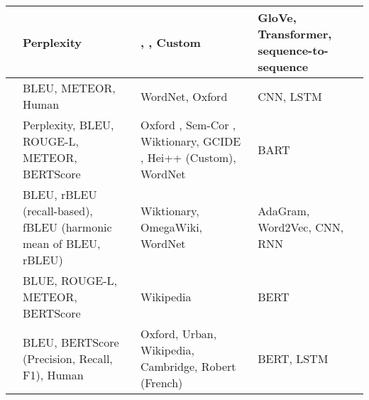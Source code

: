 \begin{longtable}{|p{3.5cm}|p{3.5cm}|p{3.5cm}|p{3.5cm}|}
    \hline
    \citeauthor{mickus_mark_2019} \citeyear{mickus_mark_2019} \cite{mickus_mark_2019}                                        & Perplexity                                                       & \cite{noraset_definition_2016}, \cite{gadetsky_conditional_2018}, Custom                                                                      & GloVe, Transformer, sequence-to-sequence \\
    \hline
    \citeauthor{li_explicit_2020} \citeyear{li_explicit_2020} \cite{li_explicit_2020}                                        & BLEU, METEOR, Human                                              & WordNet, Oxford                                                                                                                               & CNN, LSTM                                \\
    \hline
    \citeauthor{bevilacqua_generationary_2020} \citeyear{bevilacqua_generationary_2020} \cite{bevilacqua_generationary_2020} & Perplexity, BLEU, ROUGE-L, METEOR, BERTScore                     & Oxford \cite{chang_what_2019}, Sem-Cor \cite{miller_semantic_1993}, Wiktionary, GCIDE \cite{noraset_definition_2016}, Hei++ (Custom), WordNet & BART                                     \\
    \hline
    \citeauthor{sojka_evaluating_2020} \citeyear{sojka_evaluating_2020} \cite{sojka_evaluating_2020}                         & BLEU, rBLEU (recall-based), fBLEU (harmonic mean of BLEU, rBLEU) & Wiktionary, OmegaWiki, WordNet                                                                                                                & AdaGram, Word2Vec, CNN, RNN              \\
    \hline
    \citeauthor{huang_cdm_2021} \citeyear{huang_cdm_2021} \cite{huang_cdm_2021}                                              & BLUE, ROUGE-L, METEOR, BERTScore                                 & Wikipedia                                                                                                                                     & BERT                                     \\
    \hline
    \citeauthor{reid_vcdm_2020} \citeyear{reid_vcdm_2020} \cite{reid_vcdm_2020}                                              & BLEU, BERTScore (Precision, Recall, F1), Human                   & Oxford, Urban, Wikipedia, Cambridge, Robert (French)                                                                                          & BERT, LSTM                               \\
    \hline
\end{longtable}

